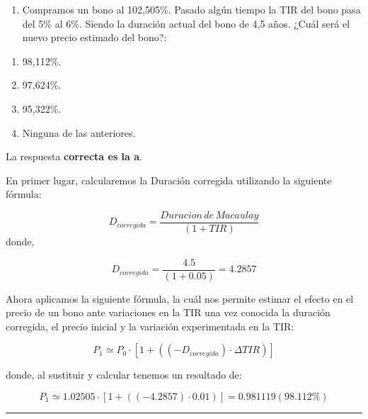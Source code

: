 \documentclass[
  letterpaper,
  DIV=11,
  numbers=noendperiod]{scrreprt}
\providecommand{\tightlist}{%
  \setlength{\itemsep}{0pt}\setlength{\parskip}{0pt}}\usepackage{longtable,booktabs,array}
\begin{document}
\begin{enumerate}
\def\labelenumi{\arabic{enumi}.}
\setcounter{enumi}{58}
\tightlist
\item
  Compramos un bono al 102,505\%. Pasado algún tiempo la TIR del bono
  pasa del 5\% al 6\%. Siendo la duración actual del bono de 4,5 años.
  ¿Cuál será el nuevo precio estimado del bono?:
\end{enumerate}

\begin{enumerate}
\def\labelenumi{\alph{enumi}.}
\item
  98,112\%.
\item
  97,624\%.
\item
  95,322\%.
\item
  Ninguna de las anteriores.
\end{enumerate}

\begin{tcolorbox}[enhanced jigsaw, left=2mm, opacityback=0, colback=white, breakable, arc=.35mm, bottomrule=.15mm, rightrule=.15mm, toprule=.15mm, leftrule=.75mm, colframe=quarto-callout-tip-color-frame]
\begin{minipage}[t]{5.5mm}
\textcolor{quarto-callout-tip-color}{\faLightbulb}
\end{minipage}%
\begin{minipage}[t]{\textwidth - 5.5mm}

La respuesta \textbf{correcta es la a}.

En primer lugar, calcularemos la Duración corregida utilizando la
siguiente fórmula:

\[D_{corregida}=\frac{Duracion\,de\, Macaulay}{\left(1+TIR\right)}\]
donde,

\[D_{corregida}=\frac{4.5}{(1+0.05)}=4.2857\]

Ahora aplicamos la siguiente fórmula, la cuál nos permite estimar el
efecto en el precio de un bono ante variaciones en la TIR una vez
conocida la duración corregida, el precio inicial y la variación
experimentada en la TIR:

\[P_1\simeq P_0\cdot\left[1+((-D_{corregida})\cdot\Delta TIR)\right]\]

donde, al sustituir y calcular tenemos un resultado de:

\[P_1\simeq 1.02505\cdot\left[1+((-4.2857)\cdot 0.01)\right]=0.981119(98.112\%)\]

\end{minipage}%
\end{tcolorbox}

\begin{center}\rule{0.5\linewidth}{0.5pt}\end{center}
\end{document}

